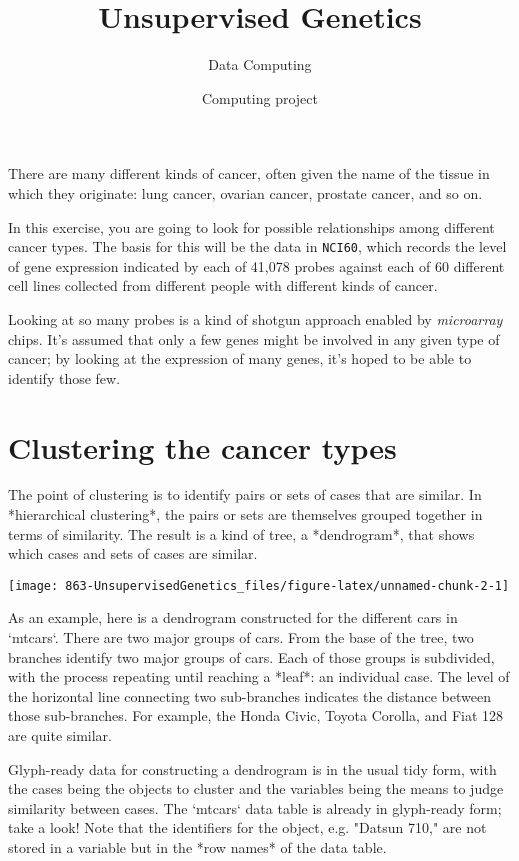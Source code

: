 \documentclass[]{tufte-handout}
\title{Unsupervised Genetics}
\author{Data Computing}
\date{Computing project}
\begin{document}
\maketitle




\begin{small}

There are many different kinds of cancer, often given the name of the tissue in which they originate: lung cancer, ovarian cancer, prostate cancer, and so on.

In this exercise, you are going to look for possible relationships among different cancer types.  The basis for this will be the data in \texttt{NCI60}, which records the level of gene expression indicated by each of 41,078 probes against each of 60 different cell lines collected from different people with different kinds of cancer.


Looking at so many probes is a kind of shotgun approach enabled by 
{\em microarray} chips.  It's assumed that only a few genes might be involved in any given type of cancer; by looking at the expression of many genes, it's hoped to be able to identify those few.
\end{small}

\section{Clustering the cancer types}\label{clustering-the-cancer-types}

\begin{small}
The point of clustering is to identify pairs or sets of cases that are similar.  In *hierarchical clustering*, the pairs or sets are themselves grouped together in terms of similarity.  The result is a kind of tree, a *dendrogram*, that shows which cases and sets of cases are similar.

\begin{marginfigure}
\texttt{[image: 863-UnsupervisedGenetics\_files/figure-latex/unnamed-chunk-2-1]} \end{marginfigure}

As an example, here is a dendrogram constructed for the different cars in `mtcars`.  There are two major groups of cars.  From the base of the tree, two branches identify two major groups of cars.  Each of those groups is subdivided, with the process repeating until reaching a *leaf*: an individual case.  The level of the horizontal line connecting two sub-branches indicates the distance between those sub-branches.  For example, the Honda Civic, Toyota Corolla, and Fiat 128 are quite similar.

Glyph-ready data for constructing a dendrogram is in the usual tidy form, with the cases being the objects to cluster and the variables being the means to judge similarity between cases. The `mtcars` data table is already in glyph-ready form; take a look! Note that the identifiers for the object, e.g. "Datsun 710," are not stored in a variable but in the *row names* of the data table.

\end{small}
\end{document}
